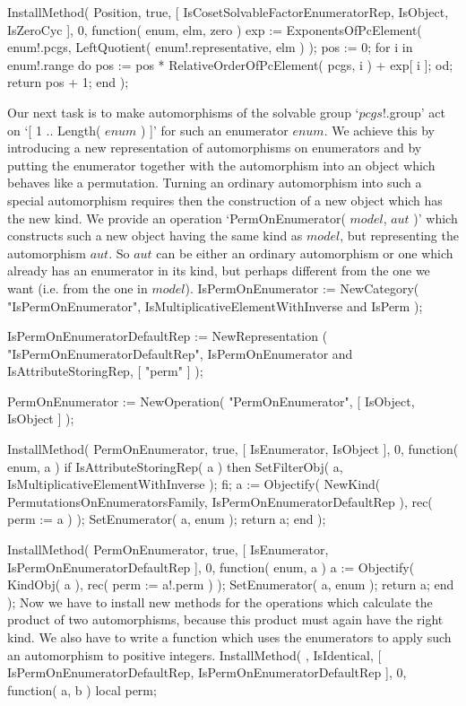 InstallMethod( Position, true, [ IsCosetSolvableFactorEnumeratorRep,
        IsObject, IsZeroCyc ], 0,
    function( enum, elm, zero )
    exp := ExponentsOfPcElement( enum!.pcgs,
                   LeftQuotient( enum!.representative, elm ) );
    pos := 0;
    for i  in enum!.range  do
        pos := pos * RelativeOrderOfPcElement( pcgs, i ) + exp[ i ];
    od;
    return pos + 1;
end );
\endtt

\null

Our  next  task  is   to  make   automorphisms   of the   solvable  group
`$pcgs$!.group' act on `[ 1 .. Length( $enum$ ) ]' for such an enumerator
$enum$.   We   achieve this  by introducing   a    new representation  of
automorphisms on enumerators and by  putting the enumerator together with
the automorphism into an object which behaves like a permutation. Turning
an  ordinary automorphism into  such a special automorphism requires then
the construction  of a new object which  has the new  kind. We provide an
operation  `PermOnEnumerator( $model$,  $aut$ )' which  constructs such a
new  object  having the   same kind   as  $model$,  but  representing the
automorphism $aut$. So  $aut$ can be either  an  ordinary automorphism or
one which  already has an enumerator  in its  kind, but perhaps different
from the one we want (i.e. from the one in $model$).
\begintt
IsPermOnEnumerator := NewCategory( "IsPermOnEnumerator",
    IsMultiplicativeElementWithInverse and IsPerm );

IsPermOnEnumeratorDefaultRep := NewRepresentation
    ( "IsPermOnEnumeratorDefaultRep",
      IsPermOnEnumerator and IsAttributeStoringRep,
      [ "perm" ] );

PermOnEnumerator := NewOperation( "PermOnEnumerator", [ IsObject, IsObject ] );

InstallMethod( PermOnEnumerator, true,
        [ IsEnumerator, IsObject ], 0,
    function( enum, a )
    if IsAttributeStoringRep( a )  then
        SetFilterObj( a, IsMultiplicativeElementWithInverse );
    fi;
    a := Objectify( NewKind( PermutationsOnEnumeratorsFamily,
                 IsPermOnEnumeratorDefaultRep ),
                 rec( perm := a ) );
    SetEnumerator( a, enum );
    return a;
end );

InstallMethod( PermOnEnumerator, true,
        [ IsEnumerator, IsPermOnEnumeratorDefaultRep ], 0,
    function( enum, a )
    a := Objectify( KindObj( a ), rec( perm := a!.perm ) );
    SetEnumerator( a, enum );
    return a;
end );
\endtt
Now we have to install new methods for the operations which calculate the
product of two  automorphisms, because this  product must  again have the
right kind. We also  have to write  a function which uses the enumerators
to apply such an automorphism to positive integers.
\begintt
InstallMethod( \*, IsIdentical,
        [ IsPermOnEnumeratorDefaultRep, IsPermOnEnumeratorDefaultRep ], 0,
    function( a, b )
    local   perm;
        

